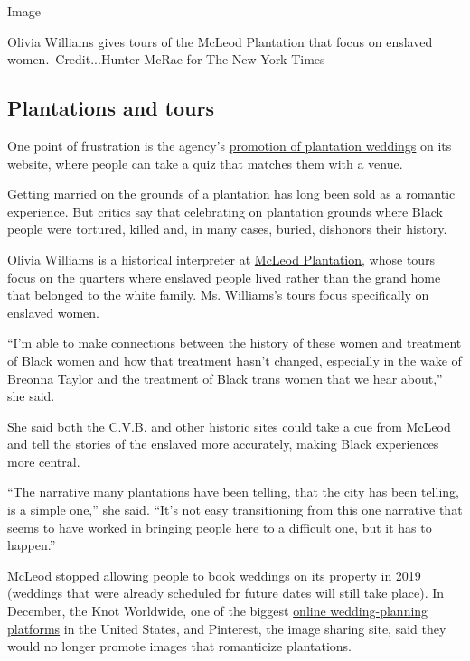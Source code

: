 Image

Olivia Williams gives tours of the McLeod Plantation that focus on
enslaved women.~Credit...Hunter McRae for The New York Times

\hypertarget{plantations-and-tours}{%
\subsection{Plantations and tours}\label{plantations-and-tours}}

One point of frustration is the agency's
\href{https://www.charlestonweddingguide.com/weddingplanner/venues~153/plantations-parks~772/}{promotion
of plantation weddings} on its website, where people can take a quiz
that matches them with a venue.

Getting married on the grounds of a plantation has long been sold as a
romantic experience. But critics say that celebrating on plantation
grounds where Black people were tortured, killed and, in many cases,
buried, dishonors their history.

Olivia Williams is a historical interpreter at
\href{https://www.ccprc.com/1447/McLeod-Plantation-Historic-Site}{McLeod
Plantation,} whose tours focus on the quarters where enslaved people
lived rather than the grand home that belonged to the white family. Ms.
Williams's tours focus specifically on enslaved women.

``I'm able to make connections between the history of these women and
treatment of Black women and how that treatment hasn't changed,
especially in the wake of Breonna Taylor and the treatment of Black
trans women that we hear about,'' she said.

She said both the C.V.B. and other historic sites could take a cue from
McLeod and tell the stories of the enslaved more accurately, making
Black experiences more central.

``The narrative many plantations have been telling, that the city has
been telling, is a simple one,'' she said. ``It's not easy transitioning
from this one narrative that seems to have worked in bringing people
here to a difficult one, but it has to happen.''

McLeod stopped allowing people to book weddings on its property in 2019
(weddings that were already scheduled for future dates will still take
place). In December, the Knot Worldwide, one of the biggest
\href{https://www.buzzfeednews.com/article/elisabethdonnelly/zola-the-knot-weddings-millennials}{online
wedding-planning platforms} in the United States, and Pinterest, the
image sharing site, said they would no longer promote images that
romanticize plantations.

